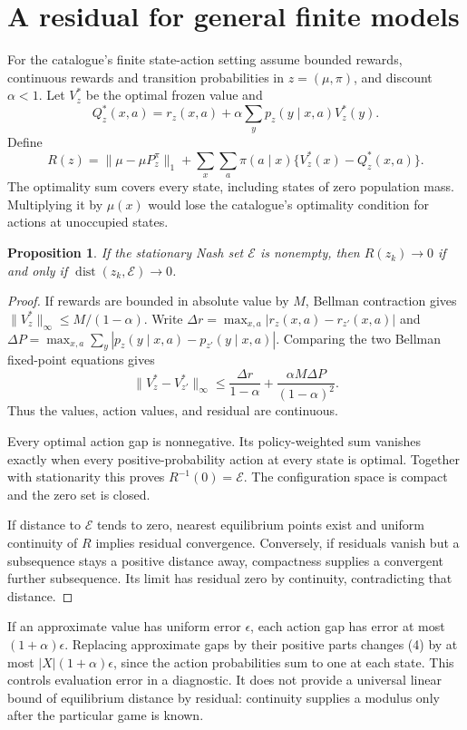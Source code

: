 \documentclass[11pt,a4paper]{article}
\newtheorem{proposition}[theorem]{Proposition}
\DeclareMathOperator{\dist}{dist}
\begin{document}
\section{A residual for general finite models}
For the catalogue's finite state-action setting assume bounded rewards, continuous rewards and transition probabilities in $z=(\mu,\pi)$, and discount $\alpha<1$. Let $V_z^*$ be the optimal frozen value and
\[
 Q_z^*(x,a)=r_z(x,a)+\alpha\sum_y p_z(y\mid x,a)V_z^*(y).
\]
Define
\[
 R(z)=\|\mu-\mu P_z^\pi\|_1+
 \sum_x\sum_a\pi(a\mid x)\{V_z^*(x)-Q_z^*(x,a)\}.
 \tag{4}
\]
The optimality sum covers every state, including states of zero population mass. Multiplying it by $\mu(x)$ would lose the catalogue's optimality condition for actions at unoccupied states.

\begin{proposition}
If the stationary Nash set $\mathcal E$ is nonempty, then
$R(z_k)\to0$ if and only if $\dist(z_k,\mathcal E)\to0$.
\end{proposition}
\begin{proof}
If rewards are bounded in absolute value by $M$, Bellman contraction gives
$\|V_z^*\|_\infty\le M/(1-\alpha)$. Write $\Delta r=\max_{x,a}|r_z(x,a)-r_{z'}(x,a)|$ and $\Delta P=\max_{x,a}\sum_y|p_z(y\mid x,a)-p_{z'}(y\mid x,a)|$. Comparing the two Bellman fixed-point equations gives
\[
 \|V_z^*-V_{z'}^*\|_\infty
 \le \frac{\Delta r}{1-\alpha}
       +\frac{\alpha M\Delta P}{(1-\alpha)^2}.
\]
Thus the values, action values, and residual are continuous.

Every optimal action gap is nonnegative. Its policy-weighted sum vanishes exactly when every positive-probability action at every state is optimal. Together with stationarity this proves $R^{-1}(0)=\mathcal E$. The configuration space is compact and the zero set is closed.

If distance to $\mathcal E$ tends to zero, nearest equilibrium points exist and uniform continuity of $R$ implies residual convergence. Conversely, if residuals vanish but a subsequence stays a positive distance away, compactness supplies a convergent further subsequence. Its limit has residual zero by continuity, contradicting that distance.
\end{proof}
If an approximate value has uniform error $\epsilon$, each action gap has error at most $(1+\alpha)\epsilon$. Replacing approximate gaps by their positive parts changes (4) by at most $|X|(1+\alpha)\epsilon$, since the action probabilities sum to one at each state. This controls evaluation error in a diagnostic. It does not provide a universal linear bound of equilibrium distance by residual: continuity supplies a modulus only after the particular game is known.
\end{document}

